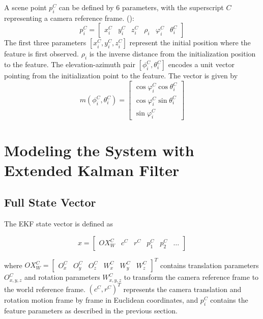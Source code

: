 A scene point $p_{i}^{C}$ can be defined by 6 parameters, with the 
superscript $C$ representing a camera reference frame. ():
\begin{equation}
p_{i}^{C}=\begin{bmatrix}
x_{i}^{C} & y_{i}^{C} & z_{i}^{C} & \rho _{i} & \varphi _{i}^{C} & 
\theta _{i}^{C} 
\end{bmatrix}
\end{equation}
The first three parameters $[x_{i}^{C}, y_{i}^{C}, z_{i}^{C}]$
represent the initial position where the feature is first observed.
$\rho _{i}$ is the inverse distance from the initialization position
to the feature. The elevation-azimuth pair $[\phi_{i}^{C},
\theta_{i}^{C}]$ encodes a unit vector pointing from the
initialization point to the feature. The vector is given by
\begin{equation}
m(\phi_{i}^{C}, \theta_{i}^{C})=\begin{bmatrix}
\cos\varphi_{i}^{C}\cos\theta _{i}^{C} \\
\cos\varphi_{i}^{C}\sin\theta _{i}^{C} \\
\sin\varphi_{i}^{C}
\end{bmatrix}
\end{equation}

\section{Modeling the System with Extended Kalman 
Filter}

\subsection{Full State Vector}

The EKF state vector is defined as 

\begin{equation}
x=\begin{bmatrix}
OX_{W}^{C} & c^{C} & r^{C} & p_{1}^{C} & p_{2}^{C} & \ldots 
\end{bmatrix}
\end{equation}

\noindent where $OX_{W}^{C}= \begin{bmatrix}O_{x}^{C} & O_{y}^{C} &
  O_{z}^{C} & W_{x}^{C} & W_{y}^{C} & W_{z}^{C} \end{bmatrix}^{T}$
contains translation parameters $O_{x,y,z}^{C}$ and rotation
parameters $W_{x,y,z}^{C}$ to transform the camera reference frame to
the world reference frame. $\left(c^{C},r^{C}\right)^{T}$ represents
the camera translation and rotation motion frame by frame in Euclidean
coordinates, and $p_{i}^{C}$ contains the feature parameters as
described in the previous section.

